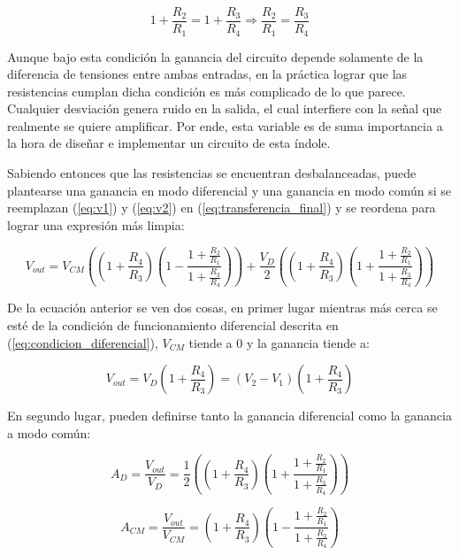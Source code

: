\begin{equation}\label{eq:condicion_diferencial}
1 + \frac{R_2}{R_1} = 1 + \frac{R_3}{R_4} \Rightarrow \boxed{\frac{R_2}{R_1} = \frac{R_3}{R_4}}
\end{equation}

Aunque bajo esta condición la ganancia del circuito depende solamente de la diferencia de tensiones entre ambas entradas, en la práctica lograr que las resistencias cumplan dicha condición es más complicado de lo que parece. Cualquier desviación genera ruido en la salida, el cual interfiere con la señal que realmente se quiere amplificar. Por ende, esta variable es de suma importancia a la hora de diseñar e implementar un circuito de esta índole. 

Sabiendo entonces que las resistencias se encuentran desbalanceadas, puede plantearse una ganancia en modo diferencial y una ganancia en modo común si se reemplazan (\ref{eq:v1}) y (\ref{eq:v2}) en (\ref{eq:transferencia_final}) y se reordena para lograr una expresión más limpia:

\begin{equation}\label{eq:ganancias_no_ideales}
V_{out} = V_{CM}((1 + \frac{R_4}{R_3})(1 - \frac{1 + \frac{R_2}{R_1}}{1 + \frac{R_3}{R_4}})) + \frac{V_D}{2}((1 + \frac{R_4}{R_3})(1 + \frac{1 + \frac{R_2}{R_1}}{1 + \frac{R_3}{R_4}}))
\end{equation}

De la ecuación anterior se ven dos cosas, en primer lugar mientras más cerca se esté de la condición de funcionamiento diferencial descrita en (\ref{eq:condicion_diferencial}), $V_{CM}$ tiende a 0 y la ganancia tiende a:

\begin{equation}\label{ganancia_diferencial_ideal}
\boxed{V_{out} = V_D(1 + \frac{R_4}{R_3}) = (V_2 - V_1)(1 + \frac{R_4}{R_3})}
\end{equation}


En segundo lugar, pueden definirse tanto la ganancia diferencial como la ganancia a modo común:

\begin{equation}\label{eq:ganancia_diferencial}
A_D = \frac{V_{out}}{V_D} = \frac{1}{2}((1 + \frac{R_4}{R_3})(1 + \frac{1 + \frac{R_2}{R_1}}{1 + \frac{R_3}{R_4}}))
\end{equation}

\begin{equation}\label{eq:ganancia_comun}
A_{CM} = \frac{V_{out}}{V_{CM}} = (1 + \frac{R_4}{R_3})(1 - \frac{1 + \frac{R_2}{R_1}}{1 + \frac{R_3}{R_4}})
\end{equation}

